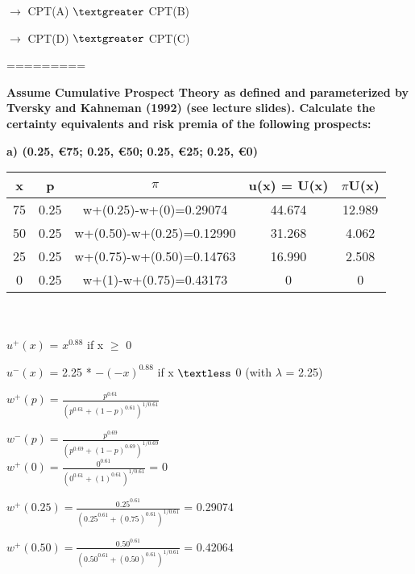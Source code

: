 \documentclass{article}
\begin{document}
\vspace{1mm}

$\rightarrow$ CPT(A) $\textgreater$ CPT(B)  

 $\rightarrow$  CPT(D) $\textgreater$ CPT(C)

=========

 \textbf{Assume Cumulative Prospect Theory as defined and parameterized by Tversky and Kahneman (1992) (see lecture slides). Calculate the certainty equivalents and risk premia of the following prospects: } 
  
  \vspace{2mm}
  
\textbf{ a) (0.25, €75; 0.25, €50; 0.25, €25; 0.25, €0)} 

\vspace{2mm}

	\begin{tabular}{|c|c|c|c|c|}
		\hline
		x  & p    & $\pi$                         & u(x) = U(x) & $\pi$U(x)  \\ \hline
		75 & 0.25 & w+(0.25)-w+(0)=0.29074    & 44.674      & 12.989 \\ \hline
		50 & 0.25 & w+(0.50)-w+(0.25)=0.12990 & 31.268      & 4.062  \\ \hline
		25 & 0.25 & w+(0.75)-w+(0.50)=0.14763 & 16.990      & 2.508  \\ \hline
		0  & 0.25 & w+(1)-w+(0.75)=0.43173    & 0           & 0      \\ \hline
	\end{tabular} \\ \\



$u^+(x)$ = $x^{0.88}$ if x $\geq$ 0

$u^-(x)$ = 2.25 * $-(-x)^{0.88}$ if x $\textless$ 0     (with $\lambda$ = 2.25) \\

\Large

$w^+(p) = \frac{p^{0.61}}{(p^{0.61}+(1-p)^{0.61})^{1/0.61}}$

$w^-(p) = \frac{p^{0.69}}{(p^{0.69}+(1-p)^{0.69})^{1/0.69}}$ \\ 


$w^+(0) = \frac{0^{0.61}}{(0^{0.61}+(1)^{0.61})^{1/0.61}}$ = 0

$w^+(0.25) = \frac{0.25^{0.61}}{(0.25^{0.61}+(0.75)^{0.61})^{1/0.61}}$ = 0.29074

$w^+(0.50) = \frac{0.50^{0.61}}{(0.50^{0.61}+(0.50)^{0.61})^{1/0.61}}$ = 0.42064
\end{document}
